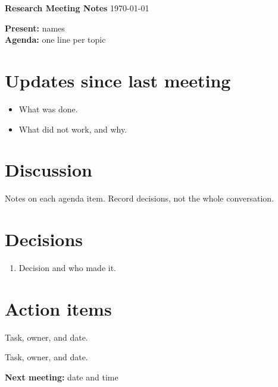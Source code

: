 \documentclass[11pt,a4paper]{article}
\begin{document}
{\Large \textbf{Research Meeting Notes}} \hfill \today

\textbf{Present:} names \\
\textbf{Agenda:} one line per topic

\section*{Updates since last meeting}
\begin{itemize}[leftmargin=1.5em]
  \item What was done.
  \item What did not work, and why.
\end{itemize}

\section*{Discussion}
Notes on each agenda item. Record decisions, not the whole conversation.

\section*{Decisions}
\begin{enumerate}[leftmargin=1.5em]
  \item Decision and who made it.
\end{enumerate}

\section*{Action items}
\begin{todolist}
  \item Task, owner, and date.
  \item Task, owner, and date.
\end{todolist}

\textbf{Next meeting:} date and time
\end{document}
